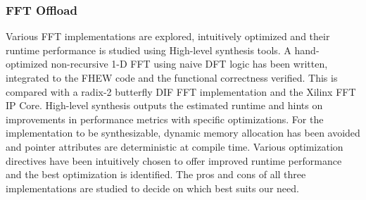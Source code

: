 \subsubsection*{FFT Offload}
Various FFT implementations are explored, intuitively optimized and their runtime performance is studied using High-level synthesis tools.
A hand-optimized non-recursive 1-D FFT using naive DFT logic has been written, integrated to the FHEW code and the functional correctness verified. This is compared with a radix-2 butterfly DIF FFT implementation and the Xilinx FFT IP Core. High-level synthesis outputs the estimated runtime and hints on improvements in performance metrics with specific optimizations. \newline\newline
For the implementation to be synthesizable, dynamic memory allocation has been avoided and pointer attributes are deterministic at compile time. Various optimization directives have been intuitively chosen to offer improved runtime performance and the best optimization is identified. The pros and cons of all three implementations are studied to decide on which best suits our need. 
